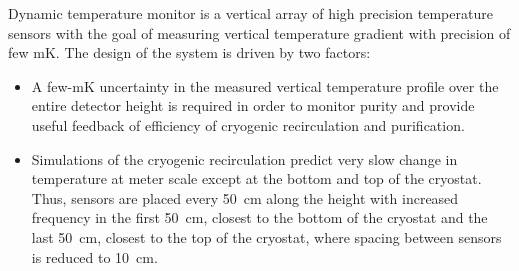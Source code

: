 Dynamic temperature monitor is a vertical array of high precision temperature sensors with the goal of measuring vertical temperature gradient with precision of few \si{mK}. The design of the system is driven by two factors:
\begin{itemize}
\item
A few-\si{mK} uncertainty in the measured vertical temperature profile over the entire detector height is required in order to monitor \lar purity and provide useful feedback of efficiency of cryogenic recirculation and purification.
\item
Simulations of the cryogenic recirculation predict very slow change in temperature at meter scale except at the bottom and top of the cryostat. Thus, sensors are placed every \SI{50}{cm} along the  height with increased frequency in the first \SI{50}{cm}, closest to the bottom of the cryostat and the last \SI{50}{cm}, closest to the top of the cryostat, where spacing between sensors is reduced to \SI{10}{cm}.
 \end{itemize}



